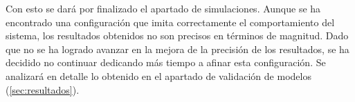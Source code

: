 Con esto se dará por finalizado el apartado de simulaciones. Aunque se ha encontrado una configuración que imita correctamente el comportamiento del sistema, los resultados obtenidos no son precisos en términos de magnitud. Dado que no se ha logrado avanzar en la mejora de la precisión de los resultados, se ha decidido no continuar dedicando más tiempo a afinar esta configuración. Se analizará en detalle lo obtenido en el apartado de validación de modelos (\ref{sec:resultados}).